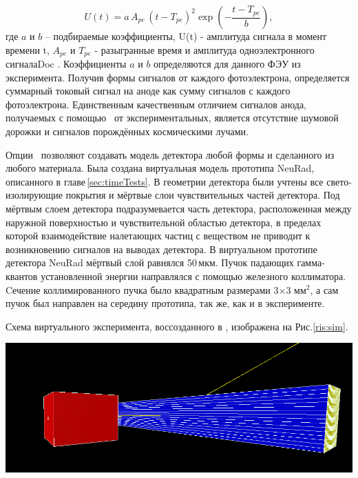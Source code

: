 \begin{enumerate}
	\begin{equation}
	\label{eq:1electronSIM}
	U(t)=a\, A_{pe}\,(t-T_{pe})^2 \exp\left(- \frac{t-T_{pe}}{b} \right),
	\end{equation}
	где $a$ и $b$ – подбираемые коэффициенты, U(t) - амплитуда сигнала в момент времени t, $A_{pe}$ и $T_{pe}$ - разыгранные время и амплитуда одноэлектронного сигналаDoc	. 
	Коэффициенты $a$ и $b$ определяются для данного ФЭУ из эксперимента.
	Получив формы сигналов от каждого фотоэлектрона, определяется суммарный токовый сигнал на аноде как сумму сигналов с каждого фотоэлектрона. 
	Единственным качественным отличием сигналов анода, получаемых с помощью \er\ от экспериментальных, является отсутствие шумовой дорожки и сигналов порождённых космическими лучами.

	 
\end{enumerate}

Опции \er\ позволяют создавать модель детектора любой формы и сделанного из любого материала. Была создана виртуальная модель прототипа NeuRad, описанного в главе\,\ref{sec:timeTests}. В геометрии детектора были учтены все свето-изолирующие покрытия и мёртвые слои чувствительных частей детектора. 
Под мёртвым слоем детектора подразумевается  часть детектора, расположенная между наружной поверхностью и чувствительной областью детектора, в пределах которой взаимодействие налетающих частиц с веществом не приводит к возникновению сигналов на выводах детектора.
В виртуальном прототипе детектора NeuRad мёртвый слой равнялся 50\,мкм. Пучок падающих гамма-квантов установленной энергии направлялся с помощью железного коллиматора. Cечение коллимированного пучка было квадратным размерами 3$\times$3 мм$^ 2$, а сам пучок был направлен на середину прототипа, так же, как и в эксперименте.

Схема виртуального эксперимента, воссозданного в \er, изображена на Рис.\ref{ris:sim}. 

{
	\centering
	\includegraphics[width=\linewidth]{sim.png}
	\label{ris:sim}
}

